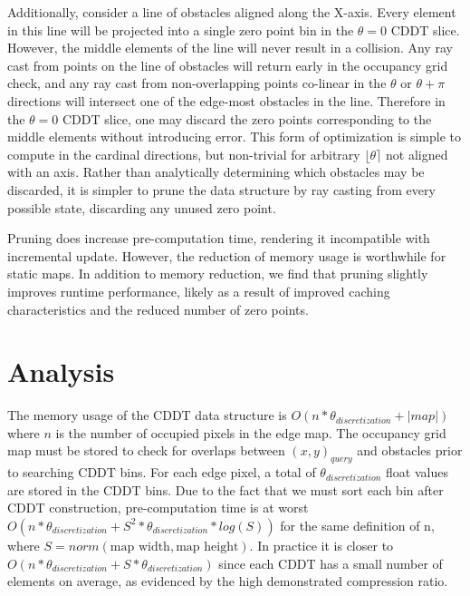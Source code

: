 \documentclass[letterpaper, 10 pt, conference]{ieeeconf}  %
\let\oldmarginpar\marginpar
\renewcommand\marginpar[1]{\-\oldmarginpar[\raggedleft\footnotesize #1]%
{\raggedright\footnotesize #1}}
\newcommand{\skcomment}[2]{{\color{red}#1} \marginpar{\color{blue}\tiny #2 (SK)}}
\begin{document}
Additionally, consider a line of obstacles aligned along the X-axis. Every element in this line will be projected into a single zero point bin in the $\theta=0$ CDDT slice. However, the middle elements of the line will never result in a collision. Any ray cast from points on the line of obstacles will return early in the occupancy grid check, and any ray cast from non-overlapping points co-linear in the $\theta$ or $\theta+\pi$ directions will intersect one of the edge-most obstacles in the line. Therefore in the $\theta=0$ CDDT slice, one may discard the zero points corresponding to the middle elements without introducing error. This form of optimization is simple to compute in the cardinal directions, but non-trivial for arbitrary $\lfloor\theta\rceil$ not aligned with an axis. Rather than analytically determining which obstacles may be discarded, it is simpler to prune the data structure by ray casting from every possible state, discarding any unused zero point. 

Pruning does increase pre-computation time, rendering it incompatible with incremental update. However, the reduction of memory usage is worthwhile for static maps. In addition to memory reduction, we find that pruning slightly improves runtime performance, likely as a result of improved caching characteristics and the reduced number of zero points.

\section{Analysis}


The memory usage of the CDDT data structure is $O(n*\theta_{discretization}+|map|)$ where $n$ is the number of occupied pixels in the edge map. The occupancy grid map must be stored to check for overlaps between $(x,y)_{query}$ and obstacles prior to searching CDDT bins. For each edge pixel, a total of $\theta_{discretization}$ float values are stored in the CDDT bins. Due to the fact that we must sort each bin after CDDT construction, pre-computation time is at worst $O(n*\theta_{discretization} + S^2*\theta_{discretization}*log(S))$ for the same definition of n, where $S=norm(\text{map width},\text{map height})$. In practice it is closer to $O(n*\theta_{discretization} + S*\theta_{discretization})$ since each CDDT has a small number of elements on average, as evidenced by the high demonstrated compression ratio.
\end{document}
